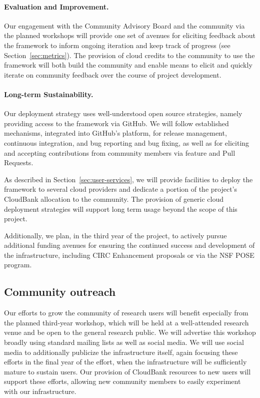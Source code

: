 \paragraph{Evaluation and Improvement.} Our engagement with the Community
Advisory Board and the community via the planned workshops will provide one set
of avenues for eliciting feedback about the framework to inform ongoing
iteration and keep track of progress (see Section~\ref{sec:metrics}).  
The provision of cloud credits to the community
to use the framework will both build the community and enable means to elicit
and quickly iterate on community feedback over the course of project
development. 

\paragraph{Long-term Sustainability.} Our deployment strategy uses
well-understood open source strategies, namely providing access to the framework
via GitHub.  We will follow established mechanisms, integrated into GitHub's
platform, for release management, continuous integration, and bug reporting and
bug fixing, as well as for eliciting and accepting contributions from community
members via feature and Pull Requests. 

As described in Section~\ref{sec:user-services}, we will provide facilities to
deploy the framework to several cloud providers and dedicate a portion of the
project's CloudBank allocation to the community.  The provision of generic cloud
deployment strategies will support long term usage beyond the scope of this
project.

Additionally, we plan, in the third year of the project, to actively pursue
additional funding avenues for ensuring the continued success and development of
the infrastructure, including CIRC Enhancement proposals or via the NSF POSE
program. 

\subsection{Community outreach}

Our efforts to grow the community of research users will benefit especially from
the planned third-year workshop, which will be held at a well-attended research
venue and be open to the general research public.  We will advertise this
workshop broadly using standard mailing lists as well as social media.  We will
use social media to additionally publicize the infrastructure itself, again
focusing these efforts in the final year of the effort, when the infrastructure
will be sufficiently mature to sustain users.  Our provision of CloudBank
resources to new users will support these efforts, allowing new community
members to easily experiment with our infrastructure.


